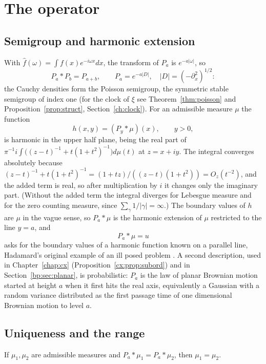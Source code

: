 \section{The operator}\label{cd:sec:operator}

\subsection{Semigroup and harmonic extension}

With $\widehat f(\omega)=\int f(x)e^{-i\omega x}dx$, the transform of $P_a$ is $e^{-a|\omega|}$, so
\[
P_a*P_b=P_{a+b},\qquad P_a=e^{-a|D|},\quad |D|=(-\partial_x^2)^{1/2}:
\]
the Cauchy densities form the Poisson semigroup, the symmetric stable semigroup of index one (for the clock of $\xi$ see Theorem~\ref{thm:poisson} and Proposition~\ref{prop:struct}, Section~\ref{ch:clock}). For an admissible measure $\mu$ the function
\[
h(x,y)=(P_y*\mu)(x),\qquad y>0,
\]
is harmonic in the upper half plane, being the real part of $\pi^{-1}i\int\bigl((z-t)^{-1}+t(1+t^2)^{-1}\bigr)d\mu(t)$ at $z=x+iy$. The integral converges absolutely because $(z-t)^{-1}+t(1+t^2)^{-1}=(1+tz)/((z-t)(1+t^2))=O_z(t^{-2})$, and the added term is real, so after multiplication by $i$ it changes only the imaginary part. (Without the added term the integral diverges for Lebesgue measure and for the zero counting measure, since $\sum_\gamma1/\lvert\gamma\rvert=\infty$.) The boundary values of $h$ are $\mu$ in the vague sense, so $P_a*\mu$ is the harmonic extension of $\mu$ restricted to the line $y=a$, and
\begin{equation}\label{cd:eq:deconv}
P_a*\mu=u
\end{equation}
asks for the boundary values of a harmonic function known on a parallel line, Hadamard's original example of an ill posed problem \cite{Hadamard23}. A second description, used in Chapter~\ref{chap:cx} (Proposition~\ref{cx:prop:subord}) and in Section~\ref{bp:sec:planar}, is probabilistic: $P_a$ is the law of planar Brownian motion started at height $a$ when it first hits the real axis, equivalently a Gaussian with a random variance distributed as the first passage time of one dimensional Brownian motion to level $a$.

\subsection{Uniqueness and the range}

\begin{proposition}[uniqueness]\label{cd:prop:unique}
If $\mu_1,\mu_2$ are admissible measures and $P_a*\mu_1=P_a*\mu_2$, then $\mu_1=\mu_2$.
\end{proposition}

